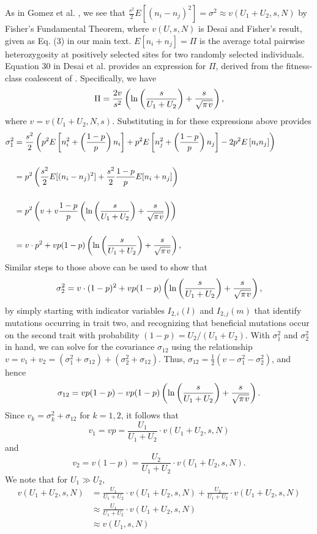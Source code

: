 \documentclass[11pt,onecolumn]{article}
\begin{document}
As in Gomez et al. \cite{gomez2019directional}, we see that $\frac{s^2}{2} E[(n_i-n_j)^2] = \sigma^2 \approx v(U_1+U_2,s,N)$ by Fisher's Fundamental Theorem, where $v(U,s,N)$ is Desai and Fisher's \citep{desai2007beneficial} result, given as Eq. (3) in our main text. $E[n_i+n_j]=\Pi$ is the average total pairwise heterozygosity at positively selected sites for two randomly selected individuals. Equation 30 in Desai et al. \cite{Desai2013} provides an expression for $\Pi$, derived from the fitness-class coalescent of \cite{Walczak753}. Specifically, we have 
\[ \Pi = \frac{2v}{s^2}\left( \ln\left(\frac{s}{U_1+U_2}\right) + \frac{s}{\sqrt{\pi \hspace{.01in}v}} \right), \]
where $v=v(U_1+U_2,N,s)$. Substituting in for these expressions above provides
\[
\begin{aligned}
\sigma_1^2 &= \frac{s^2}{2}\left( p^2 E\left[ n_i^2+\left(\frac{1-p}{p}\right)n_i\right]+ p^2 E\left[n_j^2+\left(\frac{1-p}{p}\right)n_j \right] - 2 p^2 E\left[ n_i n_j \right] \right) \hspace{0.63in} \\[5mm]
&=p^2 \left(\frac{s^2}{2} E[(n_i-n_j)^2] + \frac{s^2}{2}\frac{1-p}{p}E[n_i+n_j] \right)\\[5mm]
&=p^2 \left(v + v\frac{1-p}{p} \left( \ln\left(\frac{s}{U_1+U_2}\right) + \frac{s}{\sqrt{\pi \hspace{.01in}v}} \right) \right) \\[5mm]
&=v\cdot p^2 + vp(1-p) \left( \ln\left(\frac{s}{U_1+U_2}\right) + \frac{s}{\sqrt{\pi \hspace{.01in}v}} \right), 
\end{aligned}
\]
Similar steps to those above can be used to show that
\[
\sigma_2^2 = v\cdot (1-p)^2 + vp(1-p)\left( \ln\left(\frac{s}{U_1+U_2}\right) + \frac{s}{\sqrt{\pi \hspace{.01in}v}} \right),
\]
by simply starting with indicator variables $I_{2,i}(l)$ and $I_{2,j}(m)$ that identify mutations occurring in trait two, and recognizing that beneficial mutations occur on the second trait with probability $(1-p) = U_2/(U_1+U_2)$. With $\sigma_1^2$ and $\sigma_2^2$ in hand, we can solve for the covariance $\sigma_{12}$ using the relationship $v=v_1+v_2 = (\sigma_1^2+\sigma_{12})+(\sigma_2^2+\sigma_{12})$. Thus, $\sigma_{12} = \frac{1}{2}(v-\sigma_1^2-\sigma_2^2)$, and hence
\[
\sigma_{12} = vp(1-p) - vp(1-p)\left(\ln\left(\frac{s}{U_1+U_2}\right) + \frac{s}{\sqrt{\pi \hspace{.01in}v}} \right).
\]
Since $v_k = \sigma_k^2+\sigma_{12}$ for $k=1,2$, it follows that  
\[
v_1 =vp = \frac{U_1}{U_1+U_2}\cdot v(U_1+U_2,s,N) 
\]
and
\[
v_2 = v(1-p) = \frac{U_2}{U_1+U_2}\cdot v(U_1+U_2,s,N).
\]
We note that for $U_1\gg U_2$,
\[
\begin{aligned}
v(U_1+U_2,s,N) &= \frac{U_1}{U_1+U_2}\cdot v(U_1+U_2,s,N)+\frac{U_2}{U_1+U_2}\cdot v(U_1+U_2,s,N) \\[5mm]
&\approx \frac{U_1}{U_1+U_2}\cdot v(U_1+U_2,s,N) \\[5mm]
&\approx v(U_1,s,N)
\end{aligned}
\]



\end{document}
